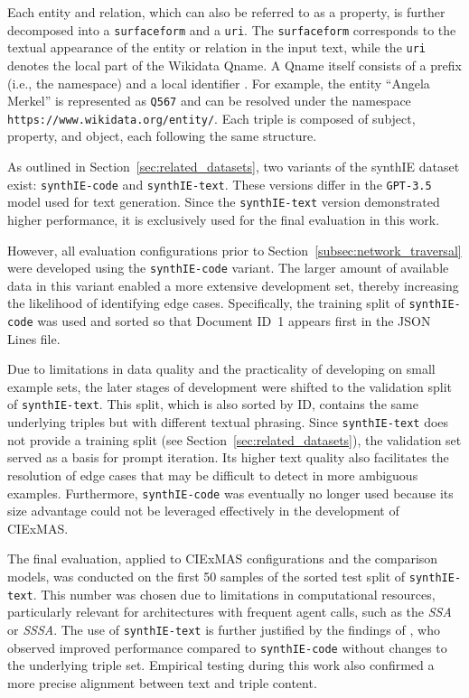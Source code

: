 \documentclass[a4paper,oneside,bibliography=totoc]{scrbook}
\begin{document}
Each entity and relation, which can also be referred to as a property, is further decomposed into a \texttt{surfaceform} and a \texttt{uri}. The \texttt{surfaceform} corresponds to the textual appearance of the entity or relation in the input text, while the \texttt{uri} denotes the local part of the Wikidata Qname. A Qname itself consists of a prefix (i.e., the namespace) and a local identifier \cite{ASF2010}. For example, the entity \enquote{Angela Merkel} is represented as \texttt{Q567} and can be resolved under the namespace \texttt{https://www.wikidata.org/entity/}. Each triple is composed of subject, property, and object, each following the same structure.

As outlined in Section~\ref{sec:related_datasets}, two variants of the synthIE dataset exist: \texttt{synthIE-code} and \texttt{synthIE-text}. These versions differ in the \texttt{GPT-3.5} model used for text generation. Since the \texttt{synthIE-text} version demonstrated higher performance, it is exclusively used for the final evaluation in this work.

However, all evaluation configurations prior to Section~\ref{subsec:network_traversal} were developed using the \texttt{synthIE-code} variant. The larger amount of available data in this variant enabled a more extensive development set, thereby increasing the likelihood of identifying edge cases. Specifically, the training split of \texttt{synthIE-code} was used and sorted so that Document ID~1 appears first in the JSON Lines file.

Due to limitations in data quality and the practicality of developing on small example sets, the later stages of development were shifted to the validation split of \texttt{synthIE-text}. This split, which is also sorted by ID, contains the same underlying triples but with different textual phrasing. Since \texttt{synthIE-text} does not provide a training split (see Section~\ref{sec:related_datasets}), the validation set served as a basis for prompt iteration. Its higher text quality also facilitates the resolution of edge cases that may be difficult to detect in more ambiguous examples. Furthermore, \texttt{synthIE-code} was eventually no longer used because its size advantage could not be leveraged effectively in the development of CIExMAS.

The final evaluation, applied to CIExMAS configurations and the comparison models, was conducted on the first 50 samples of the sorted test split of \texttt{synthIE-text}. This number was chosen due to limitations in computational resources, particularly relevant for architectures with frequent agent calls, such as the \textit{\ac{SSA}} or \textit{\ac{SSSA}}. The use of \texttt{synthIE-text} is further justified by the findings of \citet{Josifoski2023}, who observed improved performance compared to \texttt{synthIE-code} without changes to the underlying triple set. Empirical testing during this work also confirmed a more precise alignment between text and triple content.
\end{document}

